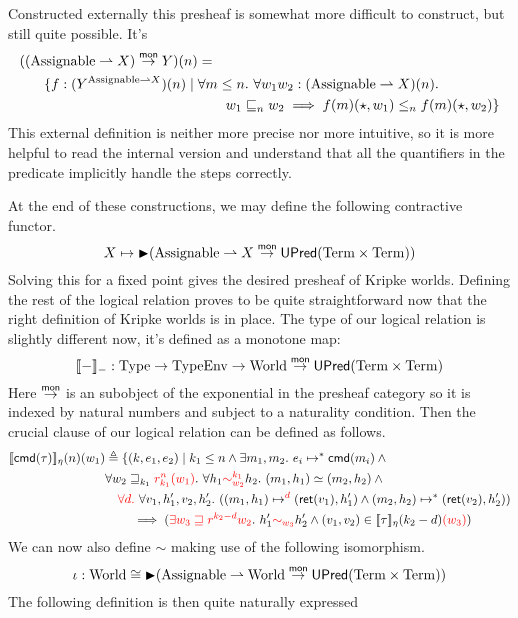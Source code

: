 Constructed externally this presheaf is somewhat more difficult to
construct, but still quite possible. It's
\begin{align*}
  ((\assignables \pto X) \mto Y)(n) &= \\
  \{f : (Y^{\assignables \pto X})(n) \mid{}&
   \forall m \le n.\ \forall w_1 w_2 : (\assignables \pto X)(n).\\
  &\qquad w_1 \reach_n w_2 \implies f(m)(\star, w_1) \le_n f(m)(\star, w_2)\}
\end{align*}
This external definition is neither more precise nor more intuitive,
so it is more helpful to read the internal version and understand that
all the quantifiers in the predicate implicitly handle the steps
correctly.

At the end of these constructions, we may define the following
contractive functor.
\[
  X \mapsto \later (\assignables \pto X \mto \upred{\term \times \term})
\]
Solving this for a fixed point gives the desired presheaf of Kripke
worlds. Defining the rest of the logical relation proves to be quite
straightforward now that the right definition of Kripke worlds is in
place. The type of our logical relation is slightly different now,
it's defined as a monotone map:
\[
  \den{-}_{-} : \types \to \typesEnv \to \worlds \mto \upred{\term \times \term}
\]
Here $\mto$ is an subobject of the exponential in the presheaf
category so it is indexed by natural numbers and subject to a
naturality condition. Then the crucial clause of our logical relation
can be defined as follows.
\begin{align*}
  \den{\cmd{\tau}}_\eta(n)(w_1)& \triangleq \{(k, e_1, e_2) \mid
  k_1 \le n \land \exists m_1, m_2.\ \steps{e_i}{\cmd{m_i}} \land{}\\
  &\forall w_2 \breach_{k_1} \different{r_{k_1}^n(w_1)}.\ \forall h_1 \different{\sim_{w_2}^{k_1}} h_2.
  \ (m_1, h_1) \simeq (m_2, h_2) \land{}\\
  &\quad \different{\forall d.}\ \forall v_1, h_1', v_2, h_2'.
  \ (\stepsM[\different{d}]{m_1}{h_1}{\ret{v_1}}{h_1'} \land \stepsM{m_2}{h_2}{\ret{v_2}}{h_2'})\\
  &\qquad \implies (\different{\exists w_3 \breach r^{k_2 - d}w_2}.
    \ h_1' \different{\sim_{w_3}} h_2' \land (v_1, v_2) \in \den{\tau}_\eta(k_2 - d)\different{(w_3)})
\end{align*}
We can now also define $\sim$ making use of the following isomorphism.
\[
  \iota : \worlds \cong
  \later (\assignables \pto \worlds \mto \upred{\term \times \term})
\]
The following definition is then quite naturally expressed
